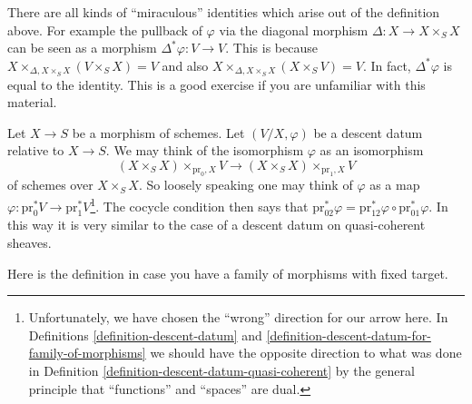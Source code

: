\noindent
There are all kinds of ``miraculous'' identities which arise out of the
definition above. For example the pullback of $\varphi$ via the diagonal
morphism $\Delta : X \to X \times_S X$ can be seen as a morphism
$\Delta^*\varphi : V \to V$.
This is because $X \times_{\Delta, X \times_S X} (V \times_S X) = V$
and also $X \times_{\Delta, X \times_S X} (X \times_S V) = V$.
In fact, $\Delta^*\varphi$ is equal to the identity.
This is a good exercise if you are unfamiliar with this material.

\begin{remark}
\label{remark-easier}
Let $X \to S$ be a morphism of schemes. Let $(V/X, \varphi)$ be
a descent datum relative to $X \to S$. We may think of the
isomorphism $\varphi$ as an isomorphism
$$
(X \times_S X) \times_{\text{pr}_0, X} V
\longrightarrow
(X \times_S X) \times_{\text{pr}_1, X} V
$$
of schemes over $X \times_S X$. So loosely speaking one may
think of $\varphi$ as a map
$\varphi : \text{pr}_0^*V \to \text{pr}_1^*V$\footnote{Unfortunately,
we have chosen the ``wrong'' direction for our arrow here. In
Definitions \ref{definition-descent-datum} and
\ref{definition-descent-datum-for-family-of-morphisms}
we should have the opposite direction to what was done in
Definition \ref{definition-descent-datum-quasi-coherent}
by the general principle that ``functions'' and ``spaces'' are dual.}.
The cocycle condition then says that
$\text{pr}_{02}^*\varphi =
\text{pr}_{12}^*\varphi \circ \text{pr}_{01}^*\varphi$.
In this way it is very similar to the case of a descent datum on
quasi-coherent sheaves.
\end{remark}

\noindent
Here is the definition in case you have a family of morphisms
with fixed target.

